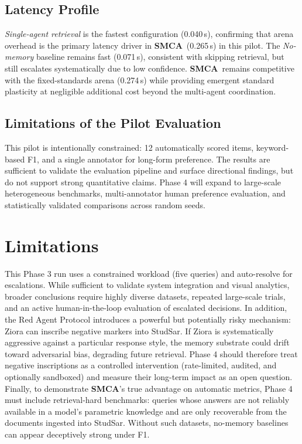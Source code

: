 \documentclass[11pt, a4paper]{article}
\newcommand{\sysname}{\textbf{SMCA}}
\begin{document}
\subsection{Latency Profile}
\textit{Single-agent retrieval} is the fastest configuration (0.040\,s), confirming that arena overhead is the primary latency driver in \sysname\ (0.265\,s) in this pilot. The \textit{No-memory} baseline remains fast (0.071\,s), consistent with skipping retrieval, but still escalates systematically due to low confidence. \sysname\ remains competitive with the fixed-standards arena (0.274\,s) while providing emergent standard plasticity at negligible additional cost beyond the multi-agent coordination.
 
\subsection{Limitations of the Pilot Evaluation}
This pilot is intentionally constrained: 12 automatically scored items, keyword-based F1, and a single annotator for long-form preference. The results are sufficient to validate the evaluation pipeline and surface directional findings, but do not support strong quantitative claims. Phase 4 will expand to large-scale heterogeneous benchmarks, multi-annotator human preference evaluation, and statistically validated comparisons across random seeds.

\section{Limitations}
This Phase 3 run uses a constrained workload (five queries) and auto-resolve for escalations. While sufficient to validate system integration and visual analytics, broader conclusions require highly diverse datasets, repeated large-scale trials, and an active human-in-the-loop evaluation of escalated decisions.
In addition, the Red Agent Protocol introduces a powerful but potentially risky mechanism: Ziora can inscribe negative markers into StudSar. If Ziora is systematically aggressive against a particular response style, the memory substrate could drift toward adversarial bias, degrading future retrieval. Phase 4 should therefore treat negative inscriptions as a controlled intervention (rate-limited, audited, and optionally sandboxed) and measure their long-term impact as an open question.
Finally, to demonstrate \sysname's true advantage on automatic metrics, Phase 4 must include retrieval-hard benchmarks: queries whose answers are not reliably available in a model's parametric knowledge and are only recoverable from the documents ingested into StudSar. Without such datasets, no-memory baselines can appear deceptively strong under F1.
\end{document}
